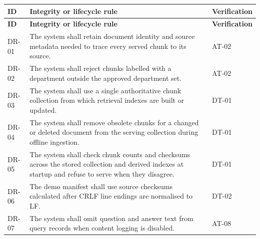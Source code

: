 \documentclass[11pt,letterpaper]{article}
\begin{document}
\endgroup

\begingroup\small

\begin{longtable}{|P{\arrayrulewidth\relax}|P{\arrayrulewidth\relax}|P{\arrayrulewidth\relax}|}

\hline{}

\textbf{ID} & \textbf{Integrity or lifecycle rule} & \textbf{Verification} \\ \hline

\endfirsthead

\hline{}

\textbf{ID} & \textbf{Integrity or lifecycle rule} & \textbf{Verification} \\ \hline

\endhead

\hline\endfoot

\hline\endlastfoot

DR-01 & The system shall retain document identity and source metadata needed to trace every served chunk to its source. & AT-02 \\ \hline

DR-02 & The system shall reject chunks labelled with a department outside the approved department set. & AT-02 \\ \hline

DR-03 & The system shall use a single authoritative chunk collection from which retrieval indexes are built or updated. & DT-01 \\ \hline

DR-04 & The system shall remove obsolete chunks for a changed or deleted document from the serving collection during offline ingestion. & DT-01 \\ \hline

DR-05 & The system shall check chunk counts and checksums across the stored collection and derived indexes at startup and refuse to serve when they disagree. & DT-01 \\ \hline

DR-06 & The demo manifest shall use source checksums calculated after CRLF line endings are normalised to LF. & DT-02 \\ \hline

DR-07 & The system shall omit question and answer text from query records when content logging is disabled. & AT-08 \\ \hline

\end{longtable}
\end{document}
